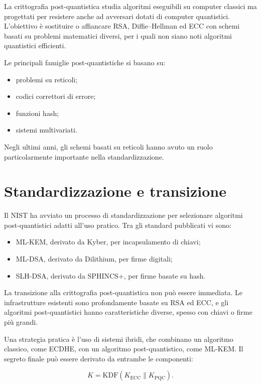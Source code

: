 \documentclass[12pt,a4paper,oneside]{report}
\begin{document}
La crittografia post-quantistica studia algoritmi eseguibili su computer classici ma progettati per resistere anche ad avversari dotati di computer quantistici. L'obiettivo è sostituire o affiancare RSA, Diffie--Hellman ed ECC con schemi basati su problemi matematici diversi, per i quali non siano noti algoritmi quantistici efficienti.

Le principali famiglie post-quantistiche si basano su:

\begin{itemize}
    \item problemi su reticoli;
    \item codici correttori di errore;
    \item funzioni hash;
    \item sistemi multivariati.
\end{itemize}

Negli ultimi anni, gli schemi basati su reticoli hanno avuto un ruolo particolarmente importante nella standardizzazione.

\section{Standardizzazione e transizione}

Il NIST ha avviato un processo di standardizzazione per selezionare algoritmi post-quantistici adatti all'uso pratico. Tra gli standard pubblicati vi sono:

\begin{itemize}
    \item ML-KEM, derivato da Kyber, per incapsulamento di chiavi;
    \item ML-DSA, derivato da Dilithium, per firme digitali;
    \item SLH-DSA, derivato da SPHINCS+, per firme basate su hash.
\end{itemize}

La transizione alla crittografia post-quantistica non può essere immediata. Le infrastrutture esistenti sono profondamente basate su RSA ed ECC, e gli algoritmi post-quantistici hanno caratteristiche diverse, spesso con chiavi o firme più grandi.

Una strategia pratica è l'uso di sistemi ibridi, che combinano un algoritmo classico, come ECDHE, con un algoritmo post-quantistico, come ML-KEM. Il segreto finale può essere derivato da entrambe le componenti:

\[
K = \mathrm{KDF}(K_{\mathrm{ECC}} \parallel K_{\mathrm{PQC}}).
\]
\end{document}
